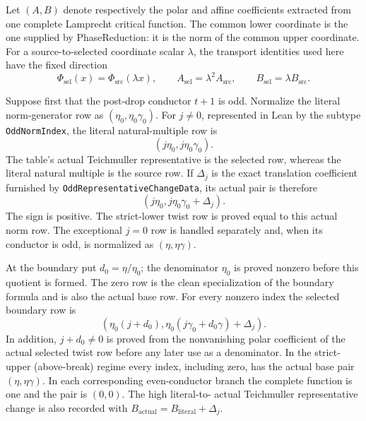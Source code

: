 \begin{lemma}
\label{mod:cases-wildodd-lowerresidualcoefficients}
Let $(A,B)$ denote respectively the polar and affine coefficients extracted
from one complete Lamprecht critical function.  The common lower coordinate
is the one supplied by PhaseReduction: it is the norm of the common upper
coordinate.  For a source-to-selected coordinate scalar $\lambda$, the
transport identities used here have the fixed direction
\[
 \Phi_{\mathrm{sel}}(x)=\Phi_{\mathrm{src}}(\lambda x),\qquad
 A_{\mathrm{sel}}=\lambda^2A_{\mathrm{src}},\qquad
 B_{\mathrm{sel}}=\lambda B_{\mathrm{src}}.
\]

Suppose first that the post-drop conductor $t+1$ is odd.  Normalize the
literal norm-generator row as $(\eta _0,\eta _0\gamma _0)$.  For
$j\ne0$, represented in Lean by the subtype
\texttt{OddNormIndex}, the literal natural-multiple row is
\[
 (j\eta _0,j\eta _0\gamma _0).
\]
The table's actual Teichmuller representative is the selected row, whereas
the literal natural multiple is the source row.  If $\Delta_j$ is the exact
translation coefficient furnished by
\texttt{OddRepresentativeChangeData}, its actual pair is therefore
\[
 (j\eta _0,j\eta _0\gamma _0+\Delta_j).
\]
The sign is positive.  The strict-lower twist row is proved equal to this
actual norm row.  The exceptional $j=0$ row is handled separately and, when
its conductor is odd, is normalized as $(\eta,\eta\gamma)$.

At the boundary put $d_0=\eta/\eta _0$; the denominator $\eta _0$ is proved
nonzero before this quotient is formed.  The zero row is the clean
specialization of the boundary formula and is also the actual base row.  For
every nonzero index the selected boundary row is
\[
 \left(
   \eta _0(j+d_0),
   \eta _0(j\gamma _0+d_0\gamma)+\Delta_j
 \right).
\]
In addition, $j+d_0\ne0$ is proved from the nonvanishing polar coefficient of
the actual selected twist row before any later use as a denominator.  In the
strict-upper (above-break) regime every index, including zero, has the actual
base pair $(\eta,\eta\gamma)$.  In each corresponding even-conductor branch
the complete function is one and the pair is $(0,0)$.  The high literal-to-
actual Teichmuller representative change is also recorded with
$B_{\mathrm{actual}}=B_{\mathrm{literal}}+\Delta_j$.


\end{lemma}
